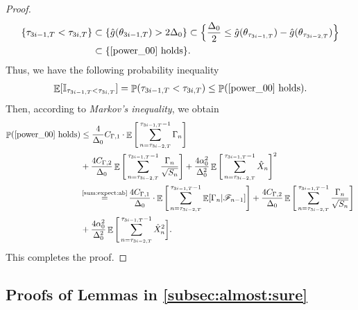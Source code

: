 \documentclass[standalone]{article}
\newcommand{\I}{\mathbb{I}}
\DeclareMathOperator{\Expect}{\mathbb{E}}
\DeclareMathOperator{\pro}{\mathbb{P}}
\DeclareMathOperator{\Pro}{\mathbb{P}}
\begin{document}
\begin{proof}
\begin{align*}
\{\tau_{3i-1,T}<\tau_{3i,T}\}&\subset \{\hat{g}(\theta_{3i-1,T})>2\Delta_{0}\}\subset\Big\{\frac{\Delta_{0}}{2}\le \hat{g}(\theta_{\tau_{3i-1,T}})-\hat{g}(\theta_{\tau_{3i-2,T}})\Big\}\\&\subset\{\text{\cref{power_00} holds}\}.
\end{align*}
Thus, we have the following probability inequality
\begin{align*}
\Expect[\I_{\tau_{3i-1,T}<\tau_{3i,T}}]=\pro(\tau_{3i-1,T}<\tau_{3i,T})\le \pro(\text{\cref{power_00} holds}).
\end{align*}
Then, according to \emph{Markov's inequality}, we obtain
\begin{align*}
\Pro(\text{\cref{power_00} holds})&\le \frac{4}{\Delta_0}C_{\Gamma,1}\cdot \Expect\Bigg[\sum_{n=\tau_{3i-2,T}}^{\tau_{3i-1,T}-1}\Gamma_n\Bigg]  \\&+ \frac{4C_{\Gamma,2}}{\Delta_0}\Expect\Bigg[\sum_{n=\tau_{3i-2,T}}^{\tau_{3i-1,T}-1}\frac{\Gamma_{n}}{\sqrt{S_{n}}}\Bigg]  + \frac{4\alpha_0^{2}}{\Delta_0^{2}}\Expect\Bigg[\sum_{n=\tau_{3i-2,T}}^{\tau_{3i-1,T}-1}\hat{X}_{n}\Bigg]^{2}\\&\mathop{=}^{\text{\cref{sum:expect:ab}}} \frac{4C_{\Gamma,1}}{\Delta_0}\cdot \Expect\Bigg[\sum_{n=\tau_{3i-2,T}}^{\tau_{3i-1,T}-1}\Expect[\Gamma_n|\mathscr{F}_{n-1}]\Bigg]  + \frac{4C_{\Gamma,2}}{\Delta_0}\Expect\Bigg[\sum_{n=\tau_{3i-2,T}}^{\tau_{3i-1,T}-1}\frac{\Gamma_{n}}{\sqrt{S_{n}}}\Bigg]\\&  + \frac{4\alpha_0^{2}}{\Delta_0^{2}}\Expect\Bigg[\sum_{n=\tau_{3i-2,T}}^{\tau_{3i-1,T}-1}\hat{X}_{n}^{2}\bigg].
\end{align*}
This completes the proof. 
\end{proof}

\subsection{Proofs of Lemmas in \cref{subsec:almost:sure}}
\end{document}

